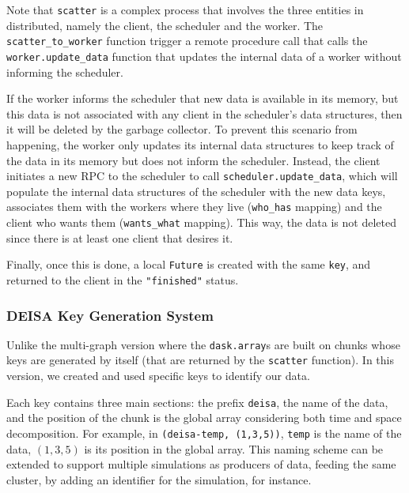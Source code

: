Note that \texttt{scatter} is a complex process that involves the three entities in \dask distributed, namely the client, the scheduler and the worker. The \texttt{scatter\_to\_worker} function trigger a remote procedure call that calls the \texttt{worker.update\_data} function that updates the internal data of a worker without informing the scheduler.

If the worker informs the scheduler that new data is available in its memory, but this data is not associated with any client in the scheduler's data structures, then it will be deleted by the garbage collector. 
To prevent this scenario from happening, the worker only updates its internal data structures to keep track of the data in its memory but does not inform the scheduler.
Instead, the client initiates a new RPC to the scheduler to call \texttt{scheduler.update\_data}, which will populate the internal data structures of the scheduler with the new data keys, associates them with the workers where they live (\texttt{who\_has} mapping) and the client who wants them (\texttt{wants\_what} mapping). This way, the data is not deleted since there is at least one client that desires it.

Finally, once this is done, a local \texttt{Future} is created with the same \texttt{key}, and returned to the client in the \texttt{"finished"} status. 

\subsubsection{DEISA Key Generation System}
Unlike the multi-graph version where the \texttt{dask.array}s are built on chunks whose keys are generated by \dask itself (that are returned by the \texttt{scatter} function). In this version, we created and used specific keys to identify our data.

Each key contains three main sections:  the prefix \texttt{deisa}, the name of the data, and the position of the chunk is the global array considering both time and space decomposition. For example, in  \texttt{(deisa-temp, (1,3,5))}, \texttt{temp} is the name of the data, $(1,3,5)$ is its position in the global array. This naming scheme can be extended to support multiple simulations as producers of data, feeding the same \dask cluster, by adding an identifier for the simulation, for instance. 

